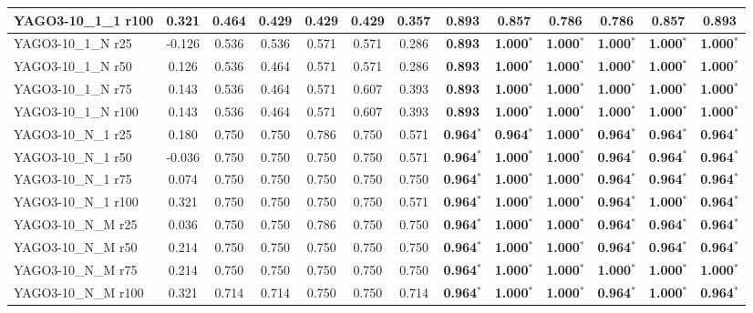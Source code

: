 \begin{table}[t]
{\begin{tabular}{l||cccccc||cccccc}
YAGO3-10\_1\_1 r100 & 0.321 & 0.464 & 0.429 & 0.429 & 0.429 & 0.357 & \textbf{0.893} & \textbf{0.857} & \textbf{0.786} & \textbf{0.786} & \textbf{0.857} & \textbf{0.893} \\
\hline
YAGO3-10\_1\_N r25 & -0.126 & 0.536 & 0.536 & 0.571 & 0.571 & 0.286 & \textbf{0.893} & \textbf{1.000}$^*$ & \textbf{1.000}$^*$ & \textbf{1.000}$^*$ & \textbf{1.000}$^*$ & \textbf{1.000}$^*$ \\
YAGO3-10\_1\_N r50 & 0.126 & 0.536 & 0.464 & 0.571 & 0.571 & 0.286 & \textbf{0.893} & \textbf{1.000}$^*$ & \textbf{1.000}$^*$ & \textbf{1.000}$^*$ & \textbf{1.000}$^*$ & \textbf{1.000}$^*$ \\
YAGO3-10\_1\_N r75 & 0.143 & 0.536 & 0.464 & 0.571 & 0.607 & 0.393 & \textbf{0.893} & \textbf{1.000}$^*$ & \textbf{1.000}$^*$ & \textbf{1.000}$^*$ & \textbf{1.000}$^*$ & \textbf{1.000}$^*$ \\
YAGO3-10\_1\_N r100 & 0.143 & 0.536 & 0.464 & 0.571 & 0.607 & 0.393 & \textbf{0.893} & \textbf{1.000}$^*$ & \textbf{1.000}$^*$ & \textbf{1.000}$^*$ & \textbf{1.000}$^*$ & \textbf{1.000}$^*$ \\
\hline
YAGO3-10\_N\_1 r25 & 0.180 & 0.750 & 0.750 & 0.786 & 0.750 & 0.571 & \textbf{0.964}$^*$ & \textbf{0.964}$^*$ & \textbf{1.000}$^*$ & \textbf{0.964}$^*$ & \textbf{0.964}$^*$ & \textbf{0.964}$^*$ \\
YAGO3-10\_N\_1 r50 & -0.036 & 0.750 & 0.750 & 0.750 & 0.750 & 0.571 & \textbf{0.964}$^*$ & \textbf{1.000}$^*$ & \textbf{1.000}$^*$ & \textbf{0.964}$^*$ & \textbf{0.964}$^*$ & \textbf{0.964}$^*$ \\
YAGO3-10\_N\_1 r75 & 0.074 & 0.750 & 0.750 & 0.750 & 0.750 & 0.750 & \textbf{0.964}$^*$ & \textbf{1.000}$^*$ & \textbf{1.000}$^*$ & \textbf{0.964}$^*$ & \textbf{0.964}$^*$ & \textbf{0.964}$^*$ \\
YAGO3-10\_N\_1 r100 & 0.321 & 0.750 & 0.750 & 0.750 & 0.750 & 0.571 & \textbf{0.964}$^*$ & \textbf{1.000}$^*$ & \textbf{1.000}$^*$ & \textbf{0.964}$^*$ & \textbf{1.000}$^*$ & \textbf{0.964}$^*$ \\
\hline
YAGO3-10\_N\_M r25 & 0.036 & 0.750 & 0.750 & 0.786 & 0.750 & 0.750 & \textbf{0.964}$^*$ & \textbf{1.000}$^*$ & \textbf{1.000}$^*$ & \textbf{0.964}$^*$ & \textbf{0.964}$^*$ & \textbf{0.964}$^*$ \\
YAGO3-10\_N\_M r50 & 0.214 & 0.750 & 0.750 & 0.750 & 0.750 & 0.750 & \textbf{0.964}$^*$ & \textbf{1.000}$^*$ & \textbf{1.000}$^*$ & \textbf{0.964}$^*$ & \textbf{0.964}$^*$ & \textbf{0.964}$^*$ \\
YAGO3-10\_N\_M r75 & 0.214 & 0.750 & 0.750 & 0.750 & 0.750 & 0.750 & \textbf{0.964}$^*$ & \textbf{1.000}$^*$ & \textbf{1.000}$^*$ & \textbf{1.000}$^*$ & \textbf{1.000}$^*$ & \textbf{1.000}$^*$ \\
YAGO3-10\_N\_M r100 & 0.321 & 0.714 & 0.714 & 0.750 & 0.750 & 0.714 & \textbf{0.964}$^*$ & \textbf{1.000}$^*$ & \textbf{1.000}$^*$ & \textbf{0.964}$^*$ & \textbf{1.000}$^*$ & \textbf{0.964}$^*$ \\
\hline
\end{tabular}%
}
\end{table}
